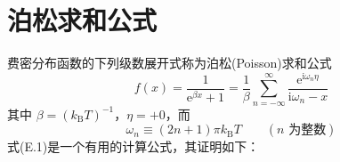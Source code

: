 %
\chapter{泊松求和公式}

费密分布函数的下列级数展开式称为泊松(Poisson)求和公式
\begin{equation}
  f(x)=\frac{1}{\mathrm{e}^{\beta x}+1}
  =\frac{1}{\beta}\sum_{n=-\infty}^{\infty}
  \frac{\mathrm{e}^{\mathrm{i}\omega_{n}\eta}}{\mathrm{i}\omega_{n}-x}
\end{equation}
其中 $\beta=(k_{\mathrm{B}}T)^{-1}$，$\eta=+0$，而
\begin{equation}
  \omega_{n}\equiv(2n+1)\pi k_{\mathrm{B}}T
  \qquad(\text{$n$ 为整数})
\end{equation}
式(E.1)是一个有用的计算公式，其证明如下：

